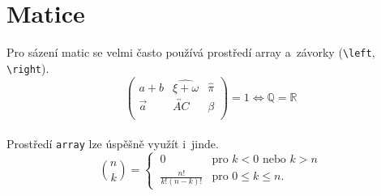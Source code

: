 \documentclass[11pt, titlepage, a4paper, twocolumn]{article}
\begin{document}
\section{Matice}
Pro sázení matic se velmi často používá prostředí array a~závorky (\verb|\left|, \verb|\right|).\\
$$ \left(\begin{array}{ccc} 
a+b&\widehat{\xi+\omega}&\hat{\pi} \\
\vec{a}&\overleftrightarrow{AC}&\beta\\
\end{array} \right) = 1 \Longleftrightarrow \mathbb{Q} = \mathbb{R}$$
\\
Prostředí \verb|array| lze úspěšně využít i~jinde.\\
$$ \binom{n}{k} = 
\left\{\begin{array}{cc}
\ 0&\text{pro } k < 0 \text{ nebo } k > n\\
\ \frac{n!}{k!(n-k)!}&\text{pro } 0 \leq k \leq n.
\end{array} \right. $$
\end{document}
